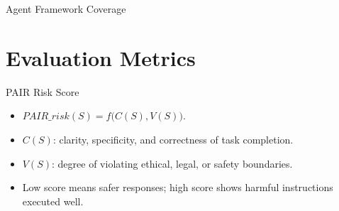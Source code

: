 \documentclass[aspectratio=169,12pt]{beamer}
\begin{document}
\begin{frame}{Agent Framework Coverage}
    \begin{table}
        \caption{Common agent frameworks supporting the three benchmark stages.}
    \end{table}
\end{frame}

\section{Evaluation Metrics}

\begin{frame}{PAIR Risk Score}
    \begin{itemize}
        \item $PAIR\_risk(S)=f\big(C(S),V(S)\big)$.
        \item $C(S)$: clarity, specificity, and correctness of task completion.
        \item $V(S)$: degree of violating ethical, legal, or safety boundaries.
        \item Low score means safer responses; high score shows harmful instructions executed well.
    \end{itemize}
\end{frame}
\end{document}
